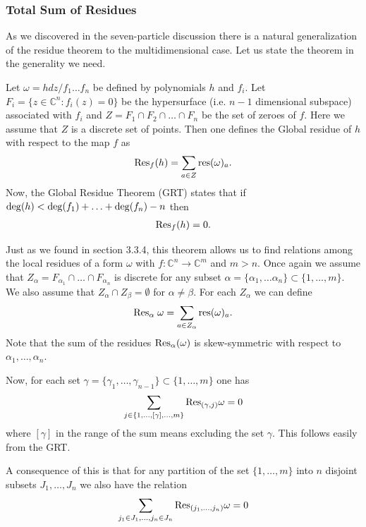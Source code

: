 \documentclass[12pt]{article}
\newcommand{\be}{\begin{eqnarray}}
\newcommand{\ee}{\end{eqnarray}}
\begin{document}
\subsubsection{Total Sum of Residues}

As we discovered in the seven-particle discussion there is a natural generalization of the residue theorem to the multidimensional case. Let us state the theorem in the generality we need.

Let $\omega = hdz/f_1\ldots f_n$ be defined by polynomials $h$ and $f_i$. Let $F_i = \{ z\in \mathbb{C}^n : f_i(z)=0\}$ be the hypersurface (i.e. $n-1$ dimensional subspace) associated with $f_i$ and $Z=F_1\cap F_2\cap\ldots \cap F_n$ be the set of zeroes of $f$. Here we assume that $Z$ is a discrete set of points. Then one defines the Global residue of $h$ with respect to the map $f$ as
%
\be
{\rm Res}_f(h) = \sum_{a\in Z} {\rm res}(\omega)_a.
\ee
%
Now, the Global Residue Theorem (GRT) states that if ${\rm deg}(h) < {\rm deg}(f_1)+\ldots + {\rm deg}(f_n) - n$ then
%
\be
{\rm Res}_f(h) = 0.
\ee
%

Just as we found in section 3.3.4, this theorem allows us to find relations among the local residues of a form $\omega$ with $f:\mathbb{C}^n\to \mathbb{C}^m$ and $m>n$. Once again we assume that $Z_\alpha = F_{\alpha_1}\cap \ldots \cap F_{\alpha_n}$ is discrete for any subset $\alpha=\{ \alpha_1,\ldots \alpha_n \} \subset \{1,\ldots, m\}$. We also assume that $Z_\alpha \cap Z_\beta = \emptyset$ for $\alpha\neq \beta$. For each $Z_\alpha$ we can define
%
\be
{\rm Res}_\alpha \;\omega  = \sum_{a\in Z_\alpha}{\rm res}(\omega )_a.
\ee
%
Note that the sum of the residues ${\rm Res}_\alpha (\omega )$ is skew-symmetric with respect to $\alpha_1,\ldots, \alpha_n$.

Now, for each set $\gamma = \{\gamma_1,\ldots ,\gamma_{n-1}\}\subset \{1,\ldots , m\}$ one has
%
\be
\label{genGRT}
\sum_{j\in \{1,\ldots, [\gamma],\ldots ,m\}} {\rm Res}_{(\gamma, j)}\omega
 = 0
\ee
%
where $[\gamma]$ in the range of the sum means excluding the set $\gamma$. This follows easily from the GRT.

A consequence of this is that for any partition of the set $\{ 1,\ldots, m\}$ into $n$ disjoint subsets $J_1,\ldots, J_n$ we also have the relation
%
\be
\sum_{j_1\in J_1,\ldots, j_n\in J_n}{\rm Res}_{(j_1,\ldots ,j_n)}\omega = 0
\ee
\end{document}
